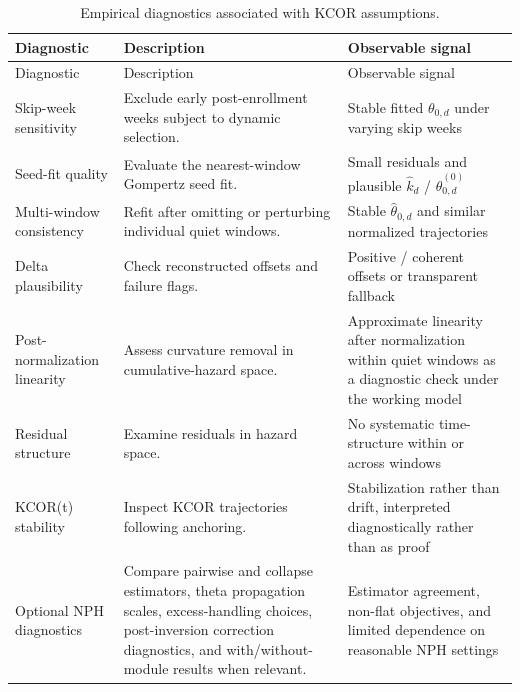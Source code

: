 \documentclass[
]{article}
\begin{document}
\begin{longtable}[]{@{}
  >{\raggedright\arraybackslash}p{}
  >{\raggedright\arraybackslash}p{}
  >{\raggedright\arraybackslash}p{}@{}}
\caption{Empirical diagnostics associated with KCOR
assumptions.}\label{tbl:si_diagnostics}\tabularnewline
\toprule\noalign{}
\begin{minipage}[b]{\linewidth}\raggedright
Diagnostic
\end{minipage} & \begin{minipage}[b]{\linewidth}\raggedright
Description
\end{minipage} & \begin{minipage}[b]{\linewidth}\raggedright
Observable signal
\end{minipage} \\
\midrule\noalign{}
\endfirsthead
\toprule\noalign{}
\begin{minipage}[b]{\linewidth}\raggedright
Diagnostic
\end{minipage} & \begin{minipage}[b]{\linewidth}\raggedright
Description
\end{minipage} & \begin{minipage}[b]{\linewidth}\raggedright
Observable signal
\end{minipage} \\
\midrule\noalign{}
\endhead
\bottomrule\noalign{}
\endlastfoot
Skip-week sensitivity & Exclude early post-enrollment weeks subject to
dynamic selection. & Stable fitted \(\theta_{0,d}\) under varying skip
weeks \\
Seed-fit quality & Evaluate the nearest-window Gompertz seed fit. &
Small residuals and plausible \(\hat{k}_d\) /
\(\hat{\theta}_{0,d}^{(0)}\) \\
Multi-window consistency & Refit after omitting or perturbing individual
quiet windows. & Stable \(\hat{\theta}_{0,d}\) and similar normalized
trajectories \\
Delta plausibility & Check reconstructed offsets and failure flags. &
Positive / coherent offsets or transparent fallback \\
Post-normalization linearity & Assess curvature removal in
cumulative-hazard space. & Approximate linearity after normalization
within quiet windows as a diagnostic check under the working model \\
Residual structure & Examine residuals in hazard space. & No systematic
time-structure within or across windows \\
KCOR(t) stability & Inspect KCOR trajectories following anchoring. &
Stabilization rather than drift, interpreted diagnostically rather than
as proof \\
Optional NPH diagnostics & Compare pairwise and collapse estimators,
theta propagation scales, excess-handling choices, post-inversion
correction diagnostics, and with/without-module results when relevant. &
Estimator agreement, non-flat objectives, and limited dependence on
reasonable NPH settings \\
\end{longtable}
\end{document}
